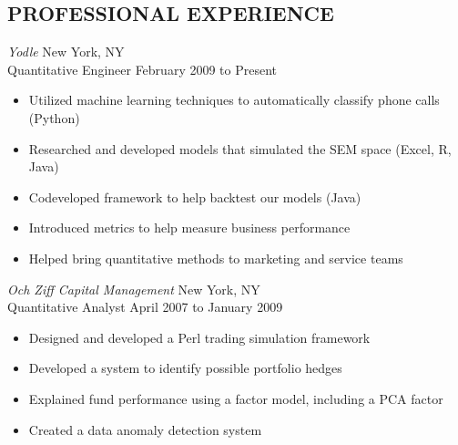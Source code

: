 \documentclass{res}
\begin{document}
\thispagestyle{empty} %


\address{547 2nd Avenue, Apt 4\hspace{0.1in}\vline\hspace{0.1in}New York, NY 10016
\hspace{0.1in}\vline\hspace{0.1in}
dangoldin@gmail.com\hspace{0.1in}\vline\hspace{0.1in}(424) 229-2286}

\begin{resume}

\section{PROFESSIONAL EXPERIENCE}
\vspace{1pt}
{\sl Yodle} \hfill New York, NY \\
Quantitative Engineer \hfill   February 2009 to Present
   \begin{itemize} \itemsep -2pt %
   \item Utilized machine learning techniques to automatically classify phone calls (Python)
   \item Researched and developed models that simulated the SEM space (Excel, R, Java)
   \item Codeveloped framework to help backtest our models (Java)
   \item Introduced metrics to help measure business performance
   \item Helped bring quantitative methods to marketing and service teams
 \end{itemize} \vspace{-6pt}

{\sl Och Ziff Capital Management} \hfill New York, NY \\
Quantitative Analyst \hfill   April 2007 to January 2009  
   \begin{itemize} \itemsep -2pt %
   \item Designed and developed a Perl trading simulation framework
   \item Developed a system to identify possible portfolio hedges
   \item Explained fund performance using a factor model, including a PCA factor
   \item Created a data anomaly detection system
 \end{itemize} \vspace{-6pt}


\end{resume}
\end{document}
